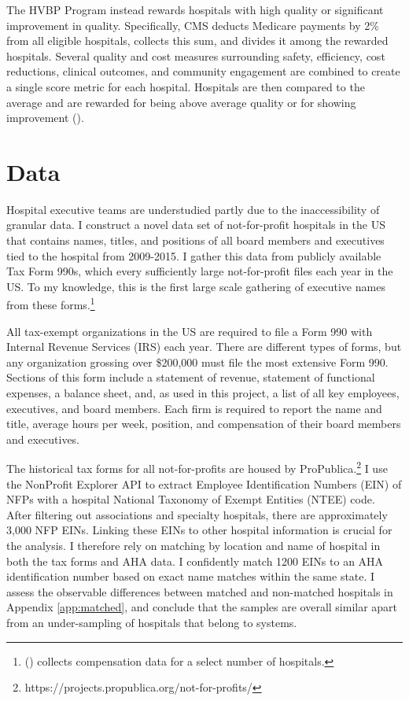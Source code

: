\documentclass[12pt]{article}
\begin{document}
    The HVBP Program instead rewards hospitals with high quality or significant improvement in quality. Specifically, CMS deducts Medicare payments by 2\% from all eligible hospitals, collects this sum, and divides it among the rewarded hospitals. Several quality and cost measures surrounding safety, efficiency, cost reductions, clinical outcomes, and community engagement are combined to create a single score metric for each hospital. Hospitals are then compared to the average and are rewarded for being above average quality or for showing improvement (\cite{CMS_2023}). 

    

	\section{Data}\label{sec:data}

    Hospital executive teams are understudied partly due to the inaccessibility of granular data. I construct a novel data set of not-for-profit hospitals in the US that contains names, titles, and positions of all board members and executives tied to the hospital from 2009-2015. I gather this data from publicly available Tax Form 990s, which every sufficiently large not-for-profit files each year in the US. To my knowledge, this is the first large scale gathering of executive names from these forms.\footnote{\citeauthor{brickley2010board} (\citeyear{brickley2010board}) collects compensation data for a select number of hospitals.} 

    All tax-exempt organizations in the US are required to file a Form 990 with Internal Revenue Services (IRS) each year. There are different types of forms, but any organization grossing over \$200,000 must file the most extensive Form 990. Sections of this form include a statement of revenue, statement of functional expenses, a balance sheet, and, as used in this project, a list of all key employees, executives, and board members. Each firm is required to report the name and title, average hours per week, position, and compensation of their board members and executives. 

    The historical tax forms for all not-for-profits are housed by ProPublica.\footnote{https://projects.propublica.org/not-for-profits/} I use the NonProfit Explorer API to extract Employee Identification Numbers (EIN) of NFPs with a hospital National Taxonomy of Exempt Entities (NTEE) code. After filtering out associations and specialty hospitals, there are approximately 3,000 NFP EINs. Linking these EINs to other hospital information is crucial for the analysis. I therefore rely on matching by location and name of hospital in both the tax forms and AHA data. I confidently match 1200 EINs to an AHA identification number based on exact name matches within the same state. I assess the observable differences between matched and non-matched hospitals in Appendix \ref{app:matched}, and conclude that the samples are overall similar apart from an under-sampling of hospitals that belong to systems.
    
\end{document}
